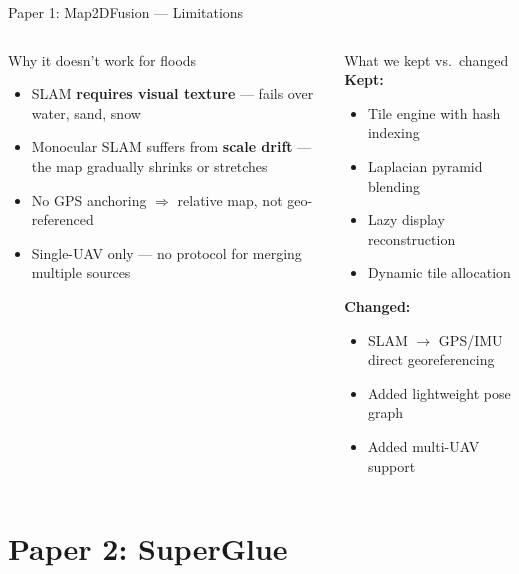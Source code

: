 \documentclass[aspectratio=169, 11pt]{beamer}
\begin{document}
\begin{frame}{Paper 1: Map2DFusion --- Limitations}
\small
\begin{columns}[T]
\begin{alertblock}{Why it doesn't work for floods}
\begin{itemize}
    \item SLAM \textbf{requires visual texture} --- fails over water, sand, snow
    \item Monocular SLAM suffers from \textbf{scale drift} --- the map gradually shrinks or stretches
    \item No GPS anchoring $\Rightarrow$ relative map, not geo-referenced
    \item Single-UAV only --- no protocol for merging multiple sources
\end{itemize}
\end{alertblock}

\begin{exampleblock}{What we kept vs.\ changed}
\textbf{Kept:}
\begin{itemize}
    \item Tile engine with hash indexing
    \item Laplacian pyramid blending
    \item Lazy display reconstruction
    \item Dynamic tile allocation
\end{itemize}
\textbf{Changed:}
\begin{itemize}
    \item SLAM $\rightarrow$ GPS/IMU direct georeferencing
    \item Added lightweight pose graph
    \item Added multi-UAV support
\end{itemize}
\end{exampleblock}
\end{columns}
\end{frame}

\section{Paper 2: SuperGlue}
\end{document}
